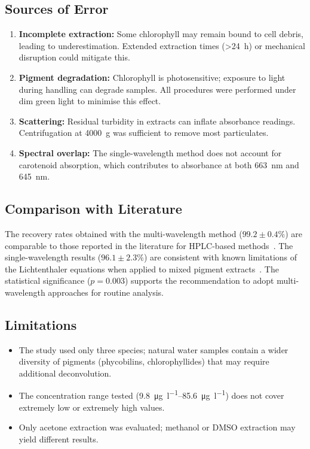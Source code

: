 \documentclass[
    language=english,
    doctype=article,
    institution=none,
    titlestyle=book,
]{../../omnilatex}
\begin{document}
\subsection{Sources of Error}
\begin{enumerate}
    \item \textbf{Incomplete extraction:} Some chlorophyll may remain bound to
          cell debris, leading to underestimation.  Extended extraction times
          (\SI{>24}{h}) or mechanical disruption could mitigate this.
    \item \textbf{Pigment degradation:} Chlorophyll is photosensitive; exposure
          to light during handling can degrade samples.  All procedures were
          performed under dim green light to minimise this effect.
    \item \textbf{Scattering:} Residual turbidity in extracts can inflate
          absorbance readings.  Centrifugation at \SI{4000}{g} was sufficient to
          remove most particulates.
    \item \textbf{Spectral overlap:} The single-wavelength method does not
          account for carotenoid absorption, which contributes to absorbance at
          both \SI{663}{\nm} and \SI{645}{\nm}.
\end{enumerate}

\subsection{Comparison with Literature}
The recovery rates obtained with the multi-wavelength method
(\(99.2 \pm 0.4\%\)) are comparable to those reported in the literature for
HPLC-based methods~\cite{bibid}.  The single-wavelength results
(\(96.1 \pm 2.3\%\)) are consistent with known limitations of the
Lichtenthaler equations when applied to mixed pigment
extracts~\cite{einstein1905}.  The statistical significance ($p = 0.003$)
supports the recommendation to adopt multi-wavelength approaches for routine
analysis.

\subsection{Limitations}
\begin{itemize}
    \item The study used only three species; natural water samples contain a
          wider diversity of pigments (phycobilins, chlorophyllides) that may
          require additional deconvolution.
    \item The concentration range tested (\SIrange{9.8}{85.6}{\micro\gram\per\litre})
          does not cover extremely low or extremely high values.
    \item Only acetone extraction was evaluated; methanol or DMSO extraction may
          yield different results.
\end{itemize}
\end{document}
